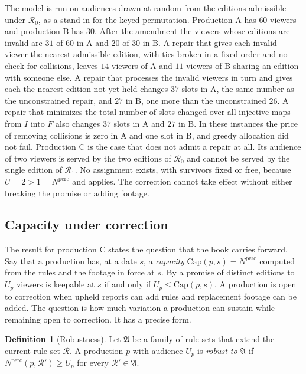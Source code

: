 \documentclass[11pt,twoside,openright]{book}
\theoremstyle{plain}
\theoremstyle{definition}
\newtheorem{definition}[theorem]{Definition}
\theoremstyle{remark}
\begin{document}
The model is run on audiences drawn at random from the editions admissible under $\mathcal R_0$, as a stand-in for the keyed permutation. Production A has $60$ viewers and production B has $30$. After the amendment the viewers whose editions are invalid are $31$ of $60$ in A and $20$ of $30$ in B. A repair that gives each invalid viewer the nearest admissible edition, with ties broken in a fixed order and no check for collisions, leaves $14$ viewers of A and $11$ viewers of B sharing an edition with someone else. A repair that processes the invalid viewers in turn and gives each the nearest edition not yet held changes $37$ slots in A, the same number as the unconstrained repair, and $27$ in B, one more than the unconstrained $26$. A repair that minimizes the total number of slots changed over all injective maps from $I$ into $F$ also changes $37$ slots in A and $27$ in B. In these instances the price of removing collisions is zero in A and one slot in B, and greedy allocation did not fail. Production C is the case that does not admit a repair at all. Its audience of two viewers is served by the two editions of $\mathcal R_0$ and cannot be served by the single edition of $\mathcal R_1$. No assignment exists, with survivors fixed or free, because $U=2>1=N^{\mathrm{perc}}$ and  applies. The correction cannot take effect without either breaking the promise or adding footage.

\subsection{Capacity under correction}

The result for production C states the question that the book carries forward. Say that a production has, at a date $s$, a \emph{capacity} $\mathrm{Cap}(p,s)=N^{\mathrm{perc}}$ computed from the rules and the footage in force at $s$. By  a promise of distinct editions to $U_p$ viewers is keepable at $s$ if and only if $U_p\le\mathrm{Cap}(p,s)$. A production is open to correction when upheld reports can add rules and replacement footage can be added. The question is how much variation a production can sustain while remaining open to correction. It has a precise form.

\begin{definition}[Robustness]\label{def:robust}
Let $\mathfrak A$ be a family of rule sets that extend the current rule set $\mathcal R$. A production $p$ with audience $U_p$ is \emph{robust to} $\mathfrak A$ if $N^{\mathrm{perc}}(p,\mathcal R')\ge U_p$ for every $\mathcal R'\in\mathfrak A$.
\end{definition}
\end{document}

